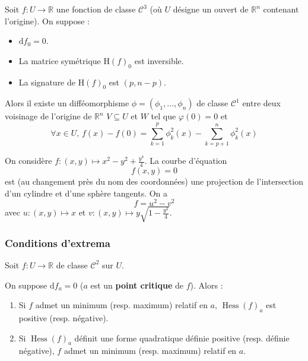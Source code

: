   \begin{lemma}[Morse]
    Soit $f : U \rightarrow \mathbb{R}$ une fonction de classe $\mathcal{C}^3$ (où $U$ désigne un ouvert de $\mathbb{R}^n$ contenant l'origine). On suppose :
    \begin{itemize}
      \item $\mathrm{d} f_0 = 0$.
      \item La matrice symétrique $\mathrm{H} (f)_0$ est inversible.
      \item La signature de $\mathrm{H}(f)_0$ est $(p, n-p)$.
    \end{itemize}
    Alors il existe un difféomorphisme $\phi = (\phi_1, \dots, \phi_n)$ de classe $\mathcal{C}^1$ entre deux voisinage de l'origine de $\mathbb{R}^n$ $V \subseteq U$ et $W$ tel que $\varphi(0) = 0$ et
    \[ \forall x \in U, \, f(x) - f(0) = \sum_{k=1}^p \phi_k^2(x) - \sum_{k=p+1}^n \phi_k^2(x) \]
  \end{lemma}


  \begin{example}
    On considère $f : (x,y) \mapsto x^2-y^2+\frac{y^4}{4}$. La courbe d'équation
    \[ f(x,y) = 0 \]
    est (au changement près du nom des coordonnées) une projection de l'intersection d'un cylindre et d'une sphère tangents. On a
    \[ f = u^2 - v^2 \]
    avec $u : (x,y) \mapsto x$ et $v : (x,y) \mapsto y \sqrt{1-\frac{y^2}{4}}$.
  \end{example}

  \subsubsection{Conditions d'extrema}

  Soit $f : U \rightarrow \mathbb{R}$ de classe $\mathcal{C}^2$ sur $U$.


  \begin{theorem}
    On suppose $\mathrm{d}f_a = 0$ ($a$ est un \textbf{point critique} de $f$). Alors :
    \begin{enumerate}[label=(\roman*)]
      \item Si $f$ admet un minimum (resp. maximum) relatif en $a$, $\operatorname{Hess}(f)_a$ est positive (resp. négative).
      \item Si $\operatorname{Hess}(f)_a$ définit une forme quadratique définie positive (resp. définie négative), $f$ admet un minimum (resp. maximum) relatif en $a$.
    \end{enumerate}
  \end{theorem}

